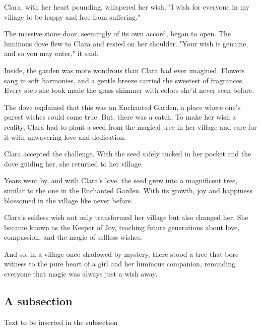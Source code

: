 \documentclass[10pt, fullpage, a4paper, titlepage]{article}
\begin{document}
Clara, with her heart pounding, whispered her wish, "I wish for everyone in my village to be happy and free from suffering."

The massive stone door, seemingly of its own accord, began to open. The luminous dove flew to Clara and rested on her shoulder. "Your wish is genuine, and so you may enter," it said.

Inside, the garden was more wondrous than Clara had ever imagined. Flowers sang in soft harmonies, and a gentle breeze carried the sweetest of fragrances. Every step she took made the grass shimmer with colors she'd never seen before.

The dove explained that this was an Enchanted Garden, a place where one’s purest wishes could come true. But, there was a catch. To make her wish a reality, Clara had to plant a seed from the magical tree in her village and care for it with unwavering love and dedication.

Clara accepted the challenge. With the seed safely tucked in her pocket and the dove guiding her, she returned to her village.

Years went by, and with Clara's love, the seed grew into a magnificent tree, similar to the one in the Enchanted Garden. With its growth, joy and happiness blossomed in the village like never before.

Clara's selfless wish not only transformed her village but also changed her. She became known as the Keeper of Joy, teaching future generations about love, compassion, and the magic of selfless wishes.

And so, in a village once shadowed by mystery, there stood a tree that bore witness to the pure heart of a girl and her luminous companion, reminding everyone that magic was always just a wish away.

\subsection{A subsection}
Text to be inserted in the subsection
\end{document}
